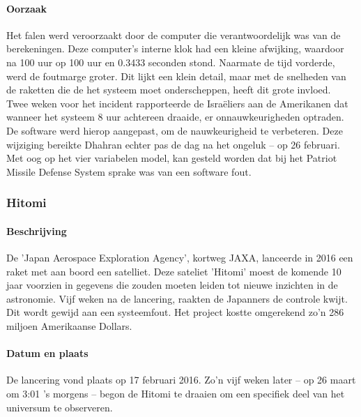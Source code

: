\documentclass{article}
\begin{document}
				\paragraph{Oorzaak}

					Het falen werd veroorzaakt door de computer die verantwoordelijk was van de berekeningen. Deze computer's interne klok had een kleine afwijking, waardoor na 100 uur op 100 uur en 0.3433 seconden stond. Naarmate de tijd vorderde, werd de foutmarge groter. \cite{skeel1992roundoff} Dit lijkt een klein detail, maar met de snelheden van de raketten die de het systeem moet onderscheppen, heeft dit grote invloed.  \\
					Twee weken voor het incident rapporteerde de Israëliers aan de Amerikanen dat wanneer het systeem 8 uur achtereen draaide, er onnauwkeurigheden optraden. De software werd hierop aangepast, om de nauwkeurigheid te verbeteren. Deze wijziging bereikte Dhahran echter pas de dag na het ongeluk -- op 26 februari. \cite{general1992patriot} \\
					Met oog op het vier variabelen model, kan gesteld worden dat bij het Patriot Missile Defense System sprake was van een software fout. \par
			
			\subsubsection{Hitomi}

				\paragraph{Beschrijving}

					De 'Japan Aerospace Exploration Agency', kortweg JAXA, lanceerde in 2016 een raket met aan boord een satelliet. Deze sateliet 'Hitomi' moest de komende 10 jaar voorzien in gegevens die zouden moeten leiden tot nieuwe inzichten in de astronomie. Vijf weken na de lancering, raakten de Japanners de controle kwijt. Dit wordt gewijd aan een systeemfout. Het project kostte omgerekend zo'n 286 miljoen Amerikaanse Dollars.

				\paragraph{Datum en plaats}

					De lancering vond plaats op 17 februari 2016. Zo'n vijf weken later -- op 26 maart om 3:01 's morgens -- begon de Hitomi te draaien om een specifiek deel van het universum te observeren.
\end{document}
